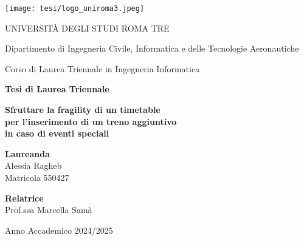 \documentclass[a4paper,12pt]{report}
\begin{document}
\begin{titlepage}
    \centering
    
    \texttt{[image: tesi/logo\_uniroma3.jpeg]}\par\vspace{0.5cm}
    
    {\large UNIVERSITÀ DEGLI STUDI ROMA TRE}\par
    \vspace{0.2cm}
    {\normalsize Dipartimento di Ingegneria Civile, Informatica e delle Tecnologie Aeronautiche}\par
    {\normalsize Corso di Laurea Triennale in Ingegneria Informatica}\par
    \vspace{1.5cm}
    
    {\large \textbf{Tesi di Laurea Triennale}}\par
    \vspace{1.5cm}
    
    {\Large \textbf{Sfruttare la fragility di un timetable \\ 
    per l'inserimento di un treno aggiuntivo \\ 
    in caso di eventi speciali}}\par
    \vspace{2cm}
    
    \begin{center}
    \textbf{Laureanda} \\
    Alessia Ragheb \\
    Matricola 550427
    \end{center}
    
    \vspace{1.2cm}
    
    \begin{flushleft}
    \textbf{Relatrice} \\
    Prof.ssa Marcella Samà
    \end{flushleft}
    
    \vfill
    
    {\normalsize Anno Accademico 2024/2025}\par
\end{titlepage}

\tableofcontents

\end{document}
